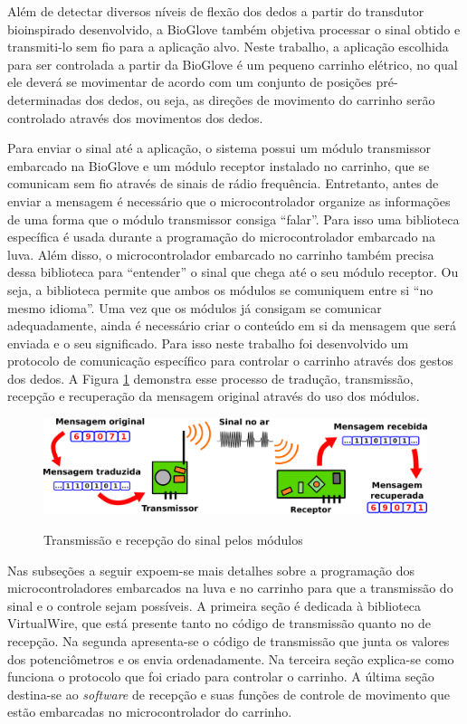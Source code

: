 \documentclass[
	12pt,				%
	openright,			%
	oneside,			%
	a4paper,			%
	english,			%
	brazil				%
	]{abntex2}
\begin{document}
		Além de detectar diversos níveis de flexão dos dedos a partir do transdutor bioinspirado desenvolvido, a BioGlove também objetiva processar o sinal obtido e transmiti-lo sem fio para a aplicação alvo. Neste trabalho, a aplicação escolhida para ser controlada a partir da BioGlove é um pequeno carrinho elétrico, no qual ele deverá se movimentar de acordo com um conjunto de posições pré-determinadas dos dedos, ou seja, as direções de movimento do carrinho serão controlado através dos movimentos dos dedos.

		Para enviar o sinal até a aplicação, o sistema possui um módulo transmissor embarcado na BioGlove e um módulo receptor instalado no carrinho, que se comunicam sem fio através de sinais de rádio frequência. Entretanto, antes de enviar a mensagem é necessário que o microcontrolador organize as informações de uma forma que o módulo transmissor consiga ``falar''. Para isso uma biblioteca específica é usada durante a programação do microcontrolador embarcado na luva. Além disso, o microcontrolador embarcado no carrinho também precisa dessa biblioteca para ``entender'' o sinal que chega até o seu módulo receptor. Ou seja, a biblioteca permite que ambos os módulos se comuniquem entre si ``no mesmo idioma''. Uma vez que os módulos já consigam se comunicar adequadamente, ainda é necessário criar o conteúdo em si da mensagem que será enviada e o seu significado. Para isso neste trabalho foi desenvolvido um protocolo de comunicação específico para controlar o carrinho através dos gestos dos dedos. A Figura \ref{Fig:tx-rx-scheme1} demonstra esse processo de tradução, transmissão, recepção e recuperação da mensagem original através do uso dos módulos.

		\begin{figure}[h!]
			\centering
			\caption{Transmissão e recepção do sinal pelos módulos}
  		\includegraphics[width=14cm]{./figures/tx-rx-scheme1.png}
  		\label{Fig:tx-rx-scheme1}
		\end{figure}

		Nas subseções a seguir expoem-se mais detalhes sobre a programação dos microcontroladores embarcados na luva e no carrinho para que a transmissão do sinal e o controle sejam possíveis. A primeira seção é dedicada à biblioteca VirtualWire, que está presente tanto no código de transmissão quanto no de recepção. Na segunda apresenta-se o código de transmissão que junta os valores dos potenciômetros e os envia ordenadamente. Na terceira seção explica-se como funciona o protocolo que foi criado para controlar o carrinho. A última seção destina-se ao \textit{software} de recepção e suas funções de controle de movimento que estão embarcadas no microcontrolador do carrinho.
\end{document}
